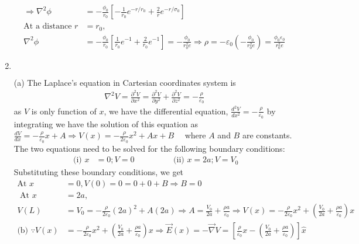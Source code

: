 \begin{enumerate}
\begin{answer}
\begin{align*}
	\Rightarrow \nabla^{2} \phi&=-\frac{\phi_{0}}{r_{0}}\left[-\frac{1}{r_{0}} e^{-r / r_{0}}+\frac{2}{r} e^{-r / \sigma_{0}}\right]\\
	\text{At a distance }r&=r_{0},\\
	\nabla^{2} \phi&=-\frac{\phi_{0}}{r_{0}}\left[\frac{1}{r_{0}} e^{-1}+\frac{2}{r_{0}} e^{-1}\right]=-\frac{\phi_{0}}{r_{0}^{2} e} \Rightarrow \rho=-\varepsilon_{0}\left(-\frac{\phi_{0}}{r_{0}^{2} e}\right)=\frac{\phi_{0} \varepsilon_{0}}{r_{0}^{2} e}
	\end{align*}
\end{answer}
\item $\left. \right. $
\begin{answer}
	 (a) The Laplace's equation in Cartesian coordinates system is
	\begin{align*}
	\nabla^{2} V=\frac{\partial^{2} V}{\partial x^{2}}=\frac{\partial^{2} V}{\partial y^{2}}+\frac{\partial^{2} V}{\partial z^{2}}=-\frac{\rho}{\varepsilon_{0}}	\end{align*}
		as $V$ is only function of $x$, we have the differential equation, $\frac{d^{2} V}{d x^{2}}=-\frac{\rho}{\varepsilon_{0}}$ by integrating we have the solution of this equation as\\
	$\frac{d V}{d x}=-\frac{\rho}{\varepsilon_{0}} x+A \Rightarrow V(x)=-\frac{\rho}{2 \varepsilon_{0}} x^{2}+A x+B \quad$ where $A$ and $B$ are constants.
	The two equations need to be solved for the following boundary conditions:
	\begin{align*}
\text{	(i) }x&=0 ; V=0\hspace{2cm}
	\text{(ii) }x=2 a ; V=V_{0}
	\end{align*}
	Substituting these boundary conditions, we get
	\begin{align*}
	\text{At }x&=0, V(0)=0=0+0+B \Rightarrow B=0\\
\text{	At }x&=2 a,\\
	V(L)&=V_{0}=-\frac{\rho}{2 \varepsilon_{0}}(2 a)^{2}+A(2 a) \Rightarrow A=\frac{V_{0}}{2 a}+\frac{\rho a}{\varepsilon_{0}} \Rightarrow V(x)=-\frac{\rho}{2 \varepsilon_{0}} x^{2}+\left(\frac{V_{0}}{2 a}+\frac{\rho a}{\varepsilon_{0}}\right) x\\
	\text{(b) }\because V(x)&=-\frac{\rho}{2 \varepsilon_{0}} x^{2}+\left(\frac{V_{0}}{2 a}+\frac{\rho a}{\varepsilon_{0}}\right) x \Rightarrow \vec{E}(x)=-\vec{\nabla} V=\left[\frac{\rho}{\varepsilon_{0}} x-\left(\frac{V_{0}}{2 a}+\frac{\rho a}{\varepsilon_{0}}\right)\right] \hat{x}
	\end{align*}
\end{answer}

\end{enumerate}
